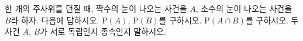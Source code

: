 한 개의 주사위를 던질 때, 짝수의 눈이 나오는 사건을 $A$, 소수의 눈이 나오는 사건을 $B$라 하자. 다음에 답하시오.
 $\mathrm{P}(A)$, $\mathrm{P}(B)$를 구하시오.
 $\mathrm{P}(A\cap B)$를 구하시오.
 두 사건 $A$, $B$가 서로 독립인지 종속인지 말하시오.
